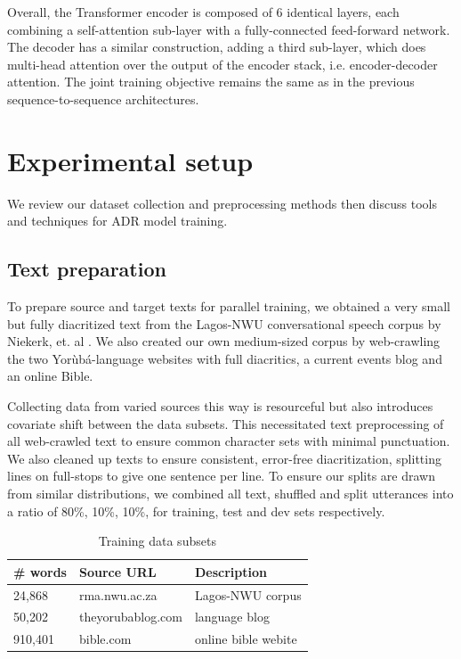 \documentclass[a4paper]{article}
\begin{document}
Overall, the Transformer encoder is composed of 6 identical layers, each combining a self-attention sub-layer with a fully-connected feed-forward network. The decoder has a similar construction, adding a third sub-layer, which does multi-head attention over the output of the encoder stack, i.e. encoder-decoder attention. The joint training objective remains the same as in the previous sequence-to-sequence architectures.

\section{Experimental setup}

We review our dataset collection and preprocessing methods then discuss tools and techniques for ADR model training.

\subsection{Text preparation}

To prepare source and target texts for parallel training, we obtained a very small but fully diacritized text from the Lagos-NWU conversational speech corpus by Niekerk, et. al \cite{niekerk2012tone}. We also created our own medium-sized corpus by web-crawling the two Yor{\`u}b{\'a}-language websites with full diacritics, a current events blog and an online Bible. 

 Collecting data from varied sources this way is resourceful but also introduces covariate shift between the data subsets. This necessitated text preprocessing of all web-crawled text to ensure common character sets with minimal punctuation. We also cleaned up texts to ensure consistent, error-free diacritization, splitting lines on full-stops to give one sentence per line. To ensure our splits are drawn from similar distributions, we combined all text, shuffled and split utterances into a ratio of 80\%, 10\%, 10\%, for training, test and dev sets respectively.   
 \begin{table}[h]
  \caption{Training data subsets}
  \label{tab:training_datasets}
  \centering
  \begin{tabular}{lll}
    \toprule
    \textbf{\# words} & \textbf{Source URL}  & \textbf{Description} \\
    \midrule
    24,868 & rma.nwu.ac.za  & Lagos-NWU corpus \\  
    50,202 & theyorubablog.com & language blog\\  
    910,401 & bible.com & online bible webite \\
    \bottomrule
  \end{tabular}
\end{table}
\end{document}
